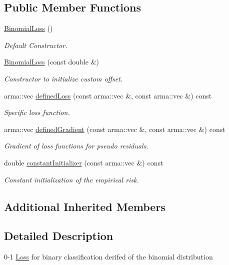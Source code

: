 \subsection*{Public Member Functions}
\begin{DoxyCompactItemize}
\item 
\mbox{\hyperlink{classloss_1_1_binomial_loss_ab903b1364d0569c83b4f44d8c7af0f69}{Binomial\+Loss}} ()
\begin{DoxyCompactList}\small\item\em Default Constructor. \end{DoxyCompactList}\item 
\mbox{\hyperlink{classloss_1_1_binomial_loss_aac60ad4791933f54fb9858e8d89ba6a5}{Binomial\+Loss}} (const double \&)
\begin{DoxyCompactList}\small\item\em Constructor to initialize custom offset. \end{DoxyCompactList}\item 
arma\+::vec \mbox{\hyperlink{classloss_1_1_binomial_loss_aa4570a731257ba43b1b4d6099c0a4515}{defined\+Loss}} (const arma\+::vec \&, const arma\+::vec \&) const
\begin{DoxyCompactList}\small\item\em Specific loss function. \end{DoxyCompactList}\item 
arma\+::vec \mbox{\hyperlink{classloss_1_1_binomial_loss_a47a27e1be3e7f2c275046b42557ca21a}{defined\+Gradient}} (const arma\+::vec \&, const arma\+::vec \&) const
\begin{DoxyCompactList}\small\item\em Gradient of loss functions for pseudo residuals. \end{DoxyCompactList}\item 
double \mbox{\hyperlink{classloss_1_1_binomial_loss_a1292422a2b07c8ebe1b168375940b029}{constant\+Initializer}} (const arma\+::vec \&) const
\begin{DoxyCompactList}\small\item\em Constant initialization of the empirical risk. \end{DoxyCompactList}\end{DoxyCompactItemize}
\subsection*{Additional Inherited Members}


\subsection{Detailed Description}
0-\/1 \mbox{\hyperlink{classloss_1_1_loss}{Loss}} for binary classification derifed of the binomial distribution 

